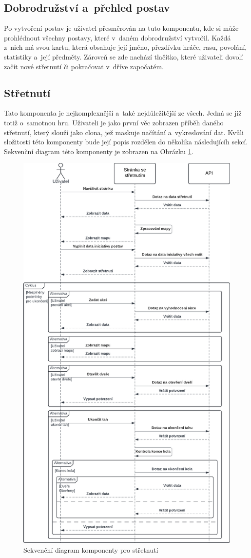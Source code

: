\subsection{Dobrodružství a~přehled postav}
Po vytvoření postav je uživatel přesměrován na tuto komponentu, kde si může prohlédnout všechny postavy, které v~daném dobrodružství vytvořil. Každá z~nich má svou kartu, která obsahuje její jméno, přezdívku hráče, rasu, povolání, statistiky a~její předměty. Zároveň se zde nachází tlačítko, které uživateli dovolí začít nové střetnutí či pokračovat v~dříve započatém.

\subsection{Střetnutí}
Tato komponenta je nejkomplexnější a~také nejdůležitější ze všech. Jedná se již totiž o~samotnou hru. Uživateli je jako první věc zobrazen příběh daného střetnutí, který slouží jako clona, jež maskuje načítání a~vykreslování dat. Kvůli složitosti této komponenty bude její popis rozdělen do několika následujícíh sekcí. Sekvenční diagram této komponenty je zobrazen na Obrázku \ref{fig:encounter_diagram}.

\begin{figure}[htbp]
  \centering
  \includegraphics[width=.70\textwidth]{resources/figures/encounter_diagram.pdf}
  \caption{Sekvenční diagram komponenty pro střetnutí}
  \label{fig:encounter_diagram}
\end{figure}

